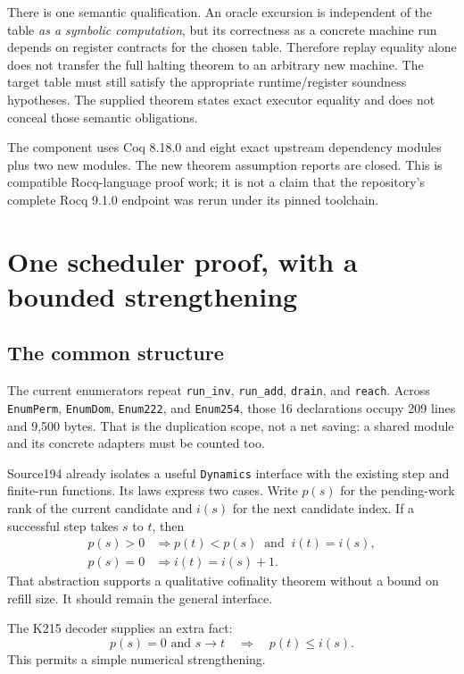 \documentclass[11pt,letterpaper]{article}
\theoremstyle{definition}
\theoremstyle{remark}
\newcommand{\code}[1]{\texttt{#1}}
\begin{document}
There is one semantic qualification. An oracle excursion is independent
of the table \emph{as a symbolic computation}, but its correctness as a
concrete machine run depends on register contracts for the chosen table.
Therefore replay equality alone does not transfer the full halting theorem
to an arbitrary new machine. The target table must still satisfy the
appropriate runtime/register soundness hypotheses. The supplied theorem
states exact executor equality and does not conceal those semantic obligations.

The component uses Coq 8.18.0 and eight exact upstream dependency modules
plus two new modules. The new theorem assumption reports are closed.
This is compatible Rocq-language proof work; it is not a claim that the
repository's complete Rocq 9.1.0 endpoint was rerun under its pinned toolchain.

\section{One scheduler proof, with a bounded strengthening}
\label{sec:scheduler}

\subsection{The common structure}

The current enumerators repeat \code{run\_inv}, \code{run\_add},
\code{drain}, and \code{reach}. Across \code{EnumPerm}, \code{EnumDom},
\code{Enum222}, and \code{Enum254}, those 16 declarations occupy 209 lines
and 9,500 bytes. That is the duplication scope, not a net saving: a shared
module and its concrete adapters must be counted too.

Source194 already isolates a useful \code{Dynamics} interface with the
existing step and finite-run functions. Its laws express two cases. Write
$p(s)$ for the pending-work rank of the current candidate and $i(s)$ for the
next candidate index. If a successful step takes $s$ to $t$, then
\begin{align*}
 p(s)>0 &\Longrightarrow p(t)<p(s)\ \text{ and }\ i(t)=i(s),\\
 p(s)=0 &\Longrightarrow i(t)=i(s)+1.
\end{align*}
That abstraction supports a qualitative cofinality theorem without a
bound on refill size. It should remain the general interface.

The K215 decoder supplies an extra fact:
\[
 p(s)=0\text{ and }s\to t \quad\Longrightarrow\quad p(t)\le i(s).
\]
This permits a simple numerical strengthening.
\end{document}
